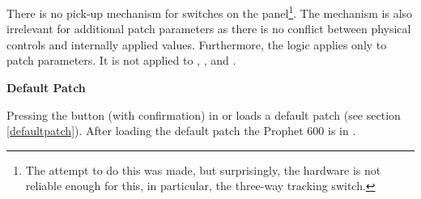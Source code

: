 There is no pick-up mechanism for switches on the panel\footnote{The attempt to do this was made, but surprisingly, the hardware is not reliable enough for this, in particular, the three-way tracking switch.}. The mechanism is also irrelevant for additional patch parameters as there is no conflict between physical controls and internally applied values. Furthermore, the logic applies only to patch parameters. It is not applied to \mastertune, \mastervol, \pitchbender and \modwheel.

\textbf{Default Patch}

Pressing the \preset button (with confirmation) in \shiftmode or \shiftlock loads a default patch (see section \ref{defaultpatch}). After loading the default patch the Prophet 600 is in \presetpatch.
